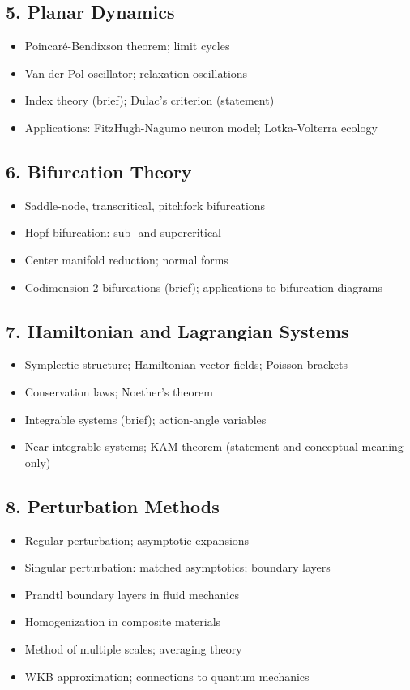 \subsection{5. Planar Dynamics}
\begin{itemize}
\item Poincar\'e-Bendixson theorem; limit cycles
\item Van der Pol oscillator; relaxation oscillations
\item Index theory (brief); Dulac's criterion (statement)
\item Applications: FitzHugh-Nagumo neuron model; Lotka-Volterra ecology
\end{itemize}

\subsection{6. Bifurcation Theory}
\begin{itemize}
\item Saddle-node, transcritical, pitchfork bifurcations
\item Hopf bifurcation: sub- and supercritical
\item Center manifold reduction; normal forms
\item Codimension-2 bifurcations (brief); applications to bifurcation diagrams
\end{itemize}

\subsection{7. Hamiltonian and Lagrangian Systems}
\begin{itemize}
\item Symplectic structure; Hamiltonian vector fields; Poisson brackets
\item Conservation laws; Noether's theorem
\item Integrable systems (brief); action-angle variables
\item Near-integrable systems; KAM theorem (statement and conceptual meaning only)
\end{itemize}

\subsection{8. Perturbation Methods}
\begin{itemize}
\item Regular perturbation; asymptotic expansions
\item Singular perturbation: matched asymptotics; boundary layers
\item Prandtl boundary layers in fluid mechanics
\item Homogenization in composite materials
\item Method of multiple scales; averaging theory
\item WKB approximation; connections to quantum mechanics
\end{itemize}

